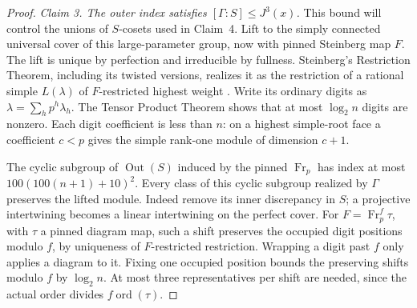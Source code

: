 \begin{proof}
\emph{Claim 3. The outer index satisfies $[\Gamma:S]\le J^3(x)$.}
This bound will control the unions of $S$-cosets used in Claim~4.
Lift to the simply connected universal cover of this large-parameter
group, now with pinned Steinberg map $F$.  The lift is unique by
perfection and irreducible by fullness.  Steinberg's Restriction Theorem,
including its twisted versions, realizes it as the restriction of a
rational simple $L(\lambda)$ of $F$-restricted highest weight
\cite{Steinberg1963,Steinberg1968,Jantzen2003}.  Write its ordinary digits
as $\lambda=\sum_h p^h\lambda_h$.  The Tensor Product Theorem shows
that at most $\log_2n$ digits are nonzero.  Each digit coefficient is less
than $n$: on a highest simple-root face a coefficient $c<p$ gives the
simple rank-one module of dimension $c+1$.

The cyclic subgroup of $\operatorname{Out}(S)$ induced by the pinned
$\operatorname{Fr}_p$ has index at most
$100(100(n+1)+10)^2$.  Every class of this cyclic subgroup realized by
$\Gamma$ preserves the lifted module.  Indeed remove its inner
discrepancy in $S$; a projective intertwining becomes a linear
intertwining on the perfect cover.  For
$F=\operatorname{Fr}_p^f\tau$, with $\tau$ a pinned diagram map, such a
shift preserves the occupied digit positions modulo $f$, by uniqueness
of $F$-restricted restriction.  Wrapping a digit past $f$ only applies a
diagram to it.  Fixing one occupied position bounds the preserving shifts
modulo $f$ by $\log_2n$.  At most three representatives per shift are
needed, since the actual order divides $f\operatorname{ord}(\tau)$.


\end{proof}
